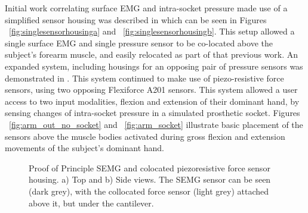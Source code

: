 \documentclass[twocolumn]{sagej}
\begin{document}
Initial work correlating surface EMG and intra-socket pressure made use of a simplified sensor housing was described in \cite{SanfordSPIE2015a} which can be seen in Figures ~\ref{fig:singlesensorhousinga} and ~\ref{fig:singlesensorhousingb}.  This setup allowed a single surface EMG and single pressure sensor to be co-located above the subject's forearm muscle, and easily relocated as part of that previous work.  %
An expanded system, including housings for an opposing pair of pressure sensors was demonstrated in \cite{SanfordPETRA02015}.  This system continued to make use of piezo-resistive force sensors, using two opposing Flexiforce A201 sensors.  This system allowed a user access to two input modalities, flexion and extension of their dominant hand, by sensing changes of intra-socket pressure in a simulated prosthetic socket.  %
Figures ~\ref{fig:arm_out_no_socket} and ~\ref{fig:arm_socket} illustrate basic placement of the sensors above the muscle bodies activated during gross flexion and extension movements of the subject's dominant hand.  \par \noindent
\begin{figure}[h]
\centering
{}
 \caption{Proof of Principle SEMG and colocated piezoresistive force sensor housing.  a) Top and b) Side views.  The SEMG sensor can be seen (dark grey), with the collocated force sensor (light grey) attached above it, but under the cantilever.}
\end{figure}
\begin{comment}
\begin{figure}[h]
\centering
\epsfig{figure=2sensor_socket.png,width=1.75in}
 \caption{Second iteration of healthy limb socket (rear view). Sensor housing seen in white.}
 \label{fig:twosensorsocket_worbla}
\end{figure}
\begin{figure}[h]
\centering
\epsfig{figure=two_sensor_socket_rear_view.png,width=2.5in}
 \caption{\textbf{\textit{maybe make the two experimental sockets one figure? Get Picture of Printed SOCKET}}}
 \label{fig:twosensorsocket_CAD}
\end{figure}
\end{comment}
\end{document}

